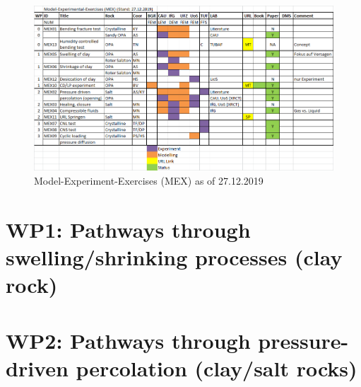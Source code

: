 \clearpage
\begin{figure}[hbtp]
\caption{Model-Experiment-Exercises (MEX) as of 27.12.2019}
\centering
\includegraphics[width=18cm,angle=90]{figures/mex-overview.png}
\end{figure}

\clearpage
%
\clearpage
%
\clearpage
%
\clearpage
\section*{WP1: Pathways through swelling/shrinking processes (clay rock)}
%
\clearpage
\clearpage
%
\clearpage
\clearpage
%
\clearpage
%
\clearpage
\clearpage
\section*{WP2: Pathways through pressure-driven percolation (clay/salt rocks)}

\clearpage

\clearpage
%
\clearpage
%
\clearpage
%
\clearpage

